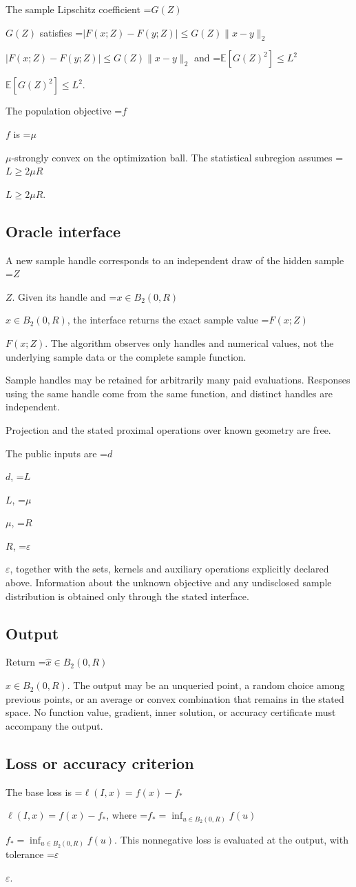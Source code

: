 \documentclass[10pt,a4paper]{article}
\newcommand{\AtlasMath}[1]{\par\begingroup\centering\setbox0=\hbox{$\displaystyle #1$}\ifdim\wd0>1.4\linewidth\typeout{ATLAS WIDE FORMULA: \the\wd0}\fi\ifdim\wd0>\linewidth\resizebox{\linewidth}{!}{\box0}\else\box0\fi\par\endgroup}
\newcommand{\AtlasInlineMath}[1]{\begingroup\setbox0=\hbox{$#1$}\ifdim\wd0>.4\linewidth\endgroup\AtlasMath{#1}\else\endgroup$#1$\fi}
\begin{document}
The sample Lipschitz coefficient \AtlasInlineMath{G(Z)} satisfies \AtlasInlineMath{|F(x;Z)-F(y;Z)|\le G(Z)\|x-y\|_2} and \AtlasInlineMath{\mathbb{E}[G(Z)^2]\le L^2}.

The population objective \AtlasInlineMath{f} is \AtlasInlineMath{\mu}-strongly convex on the optimization ball. The statistical subregion assumes \AtlasInlineMath{L\ge2\mu R}.

\subsection{Oracle interface}
A new sample handle corresponds to an independent draw of the hidden sample \AtlasInlineMath{Z}. Given its handle and \AtlasInlineMath{x\in B_2(0,R)}, the interface returns the exact sample value \AtlasInlineMath{F(x;Z)}. The algorithm observes only handles and numerical values, not the underlying sample data or the complete sample function.

Sample handles may be retained for arbitrarily many paid evaluations. Responses using the same handle come from the same function, and distinct handles are independent.

Projection and the stated proximal operations over known geometry are free.

The public inputs are \AtlasInlineMath{d}, \AtlasInlineMath{L}, \AtlasInlineMath{\mu}, \AtlasInlineMath{R}, \AtlasInlineMath{\varepsilon}, together with the sets, kernels and auxiliary operations explicitly declared above. Information about the unknown objective and any undisclosed sample distribution is obtained only through the stated interface.

\subsection{Output}
Return \AtlasInlineMath{\widehat{x}\in B_2(0,R)}. The output may be an unqueried point, a random choice among previous points, or an average or convex combination that remains in the stated space. No function value, gradient, inner solution, or accuracy certificate must accompany the output.

\subsection{Loss or accuracy criterion}
The base loss is \AtlasInlineMath{\ell(I,x)=f(x)-f_*}, where \AtlasInlineMath{f_*=\inf_{u\in B_2(0,R)}f(u)}. This nonnegative loss is evaluated at the output, with tolerance \AtlasInlineMath{\varepsilon}.
\end{document}
